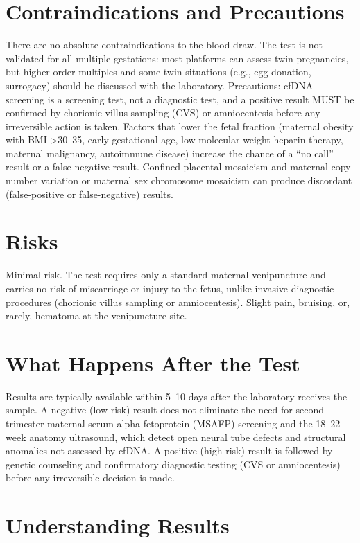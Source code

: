 \section*{Contraindications and Precautions}
There are no absolute contraindications to the blood draw. The test is not validated for all multiple gestations: most platforms can assess twin pregnancies, but higher-order multiples and some twin situations (e.g., egg donation, surrogacy) should be discussed with the laboratory. Precautions: cfDNA screening is a screening test, not a diagnostic test, and a positive result MUST be confirmed by chorionic villus sampling (CVS) or amniocentesis before any irreversible action is taken. Factors that lower the fetal fraction (maternal obesity with BMI >30--35, early gestational age, low-molecular-weight heparin therapy, maternal malignancy, autoimmune disease) increase the chance of a ``no call'' result or a false-negative result. Confined placental mosaicism and maternal copy-number variation or maternal sex chromosome mosaicism can produce discordant (false-positive or false-negative) results.

\section*{Risks}
Minimal risk. The test requires only a standard maternal venipuncture and carries no risk of miscarriage or injury to the fetus, unlike invasive diagnostic procedures (chorionic villus sampling or amniocentesis). Slight pain, bruising, or, rarely, hematoma at the venipuncture site.

\section*{What Happens After the Test}
Results are typically available within 5--10 days after the laboratory receives the sample. A negative (low-risk) result does not eliminate the need for second-trimester maternal serum alpha-fetoprotein (MSAFP) screening and the 18--22 week anatomy ultrasound, which detect open neural tube defects and structural anomalies not assessed by cfDNA. A positive (high-risk) result is followed by genetic counseling and confirmatory diagnostic testing (CVS or amniocentesis) before any irreversible decision is made.

\section*{Understanding Results}


